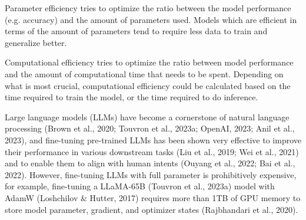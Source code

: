 \documentclass[withindex,glossary]{cam-thesis}
\begin{document}



Parameter efficiency tries to optimize the ratio between the model performance (e.g. accuracy) and the amount of parameters used. Models which are efficient in terms of the amount of parameters tend to require less data to train and generalize better.

Computational efficiency tries to optimize the ratio between model performance and the amount of computational time that needs to be spent. Depending on what is most crucial, computational efficiency could be calculated based on the time required to train the model, or the time required to do inference.



Large language models (LLMs) have become a cornerstone of natural language processing (Brown et al., 2020; Touvron et al., 2023a; OpenAI, 2023; Anil et al., 2023), and fine-tuning pre-trained LLMs has been shown very effective to improve their performance in various downstream tasks (Liu et al., 2019; Wei et al., 2021) and to enable them to align with human intents (Ouyang et al., 2022; Bai et al., 2022). However, fine-tuning LLMs with full parameter is prohibitively expensive, for example, fine-tuning a LLaMA-65B (Touvron et al., 2023a) model with AdamW (Loshchilov & Hutter, 2017) requires more than 1TB of GPU memory to store model parameter, gradient, and optimizer states (Rajbhandari et al., 2020).
\end{document}
